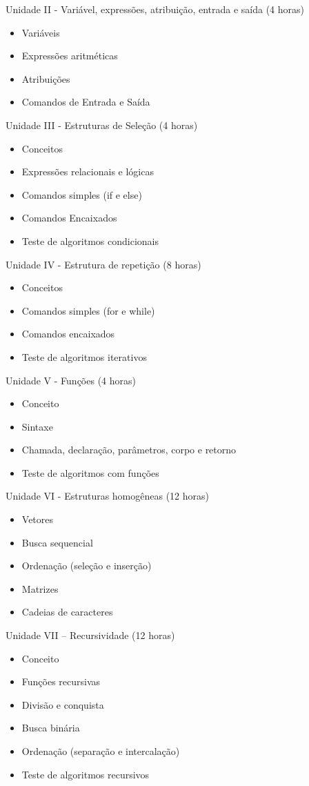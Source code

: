 \documentclass[12pt]{article}
\begin{document}
\noindent
Unidade II - Vari\'avel, express\~oes, atribui\c{c}\~ao, entrada e sa\'ida (4 horas)
\begin{itemize}
\item Vari\'aveis 
\item Express\~oes aritm\'eticas
\item Atribui\c{c}\~oes
\item Comandos de Entrada e Sa\'ida
\end{itemize}

\noindent
Unidade III - Estruturas de Sele\c{c}\~ao (4 horas)
\begin{itemize}
\item Conceitos
\item Express\~oes relacionais e l\'ogicas
\item Comandos simples (if e else)
\item Comandos Encaixados
\item Teste de algoritmos condicionais
\end{itemize}
\noindent
Unidade IV - Estrutura de repeti\c{c}\~ao (8 horas)
\begin{itemize}
\item Conceitos
\item Comandos simples (for e while)
\item Comandos encaixados
\item Teste de algoritmos iterativos
\end{itemize}

\noindent
Unidade V - Fun\c{c}\~oes (4 horas)
\begin{itemize}
\item Conceito
\item Sintaxe
\item Chamada, declara\c{c}\~ao, par\^ametros, corpo e retorno
\item Teste de algoritmos com fun\c{c}\~oes
\end{itemize}

\noindent
Unidade VI - Estruturas homog\^eneas (12 horas)
\begin{itemize}
\item Vetores
\item Busca sequencial
\item Ordena\c{c}\~ao (sele\c{c}\~ao e inser\c{c}\~ao)
\item Matrizes
\item Cadeias de caracteres
\end{itemize}

\noindent
Unidade VII – Recursividade (12 horas)
\begin{itemize}
\item Conceito
\item Fun\c{c}\~oes recursivas
\item Divis\~ao e conquista
\item Busca bin\'aria
\item Ordena\c{c}\~ao (separa\c{c}\~ao e intercala\c{c}\~ao) 
\item Teste de algoritmos recursivos
\end{itemize}
\end{document}
